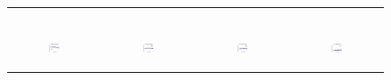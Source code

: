 \begin{figure}[ht]
\begin{tabular}{cccc}
\begin{subfigure}[b]{0.22\textwidth}
			\caption{}
			\label{appfig:partition:speedup_zigzag_setcover}
	  \end{subfigure} \\
	  \begin{subfigure}[b]{0.22\textwidth}
	  	\includegraphics[width=110pt]{images_partition/diffFA_CF2G_erdosrenyi_maxgraphcut.pdf}
			\caption{}
			\label{appfig:partition:diffFA_CF2G_erdosrenyi_maxgraphcut}
	  \end{subfigure} &
	  \begin{subfigure}[b]{0.22\textwidth}
	  	\includegraphics[width=110pt]{images_partition/diffFA_CF2G_erdosrenyi_setcover.pdf}
			\caption{}
			\label{appfig:partition:diffFA_CF2G_erdosrenyi_setcover}
	  \end{subfigure} &
	  \begin{subfigure}[b]{0.22\textwidth}
	  	\includegraphics[width=110pt]{images_partition/diffFA_CF2G_zigzag_maxgraphcut.pdf}
			\caption{}
			\label{appfig:partition:diffFA_CF2G_zigzag_maxgraphcut}
	  \end{subfigure} &
	  \begin{subfigure}[b]{0.22\textwidth}
	  	\includegraphics[width=110pt]{images_partition/diffFA_CF2G_zigzag_setcover.pdf}

\end{subfigure}
\end{tabular}
\end{figure}
